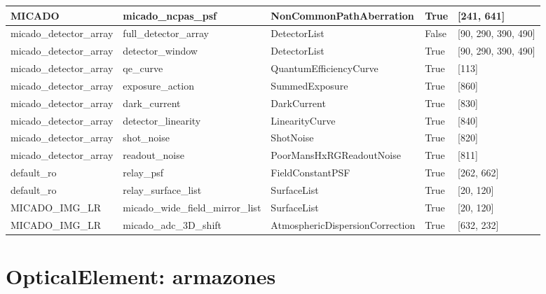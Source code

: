 \documentclass[a4paper]{article}
\newlength{\DUtablewidth} %
\begin{document}
\begin{longtable*}[c]{|p{0.181\DUtablewidth}|p{0.270\DUtablewidth}|p{0.262\DUtablewidth}|p{0.077\DUtablewidth}|p{0.165\DUtablewidth}|}
MICADO
 & 
micado\_ncpas\_psf
 & 
NonCommonPathAberration
 & 
True
 & 
{[}241, 641{]}
 \\
\hline

micado\_detector\_array
 & 
full\_detector\_array
 & 
DetectorList
 & 
False
 & 
{[}90, 290, 390, 490{]}
 \\
\hline

micado\_detector\_array
 & 
detector\_window
 & 
DetectorList
 & 
True
 & 
{[}90, 290, 390, 490{]}
 \\
\hline

micado\_detector\_array
 & 
qe\_curve
 & 
QuantumEfficiencyCurve
 & 
True
 & 
{[}113{]}
 \\
\hline

micado\_detector\_array
 & 
exposure\_action
 & 
SummedExposure
 & 
True
 & 
{[}860{]}
 \\
\hline

micado\_detector\_array
 & 
dark\_current
 & 
DarkCurrent
 & 
True
 & 
{[}830{]}
 \\
\hline

micado\_detector\_array
 & 
detector\_linearity
 & 
LinearityCurve
 & 
True
 & 
{[}840{]}
 \\
\hline

micado\_detector\_array
 & 
shot\_noise
 & 
ShotNoise
 & 
True
 & 
{[}820{]}
 \\
\hline

micado\_detector\_array
 & 
readout\_noise
 & 
PoorMansHxRGReadoutNoise
 & 
True
 & 
{[}811{]}
 \\
\hline

default\_ro
 & 
relay\_psf
 & 
FieldConstantPSF
 & 
True
 & 
{[}262, 662{]}
 \\
\hline

default\_ro
 & 
relay\_surface\_list
 & 
SurfaceList
 & 
True
 & 
{[}20, 120{]}
 \\
\hline

MICADO\_IMG\_LR
 & 
micado\_wide\_field\_mirror\_list
 & 
SurfaceList
 & 
True
 & 
{[}20, 120{]}
 \\
\hline

MICADO\_IMG\_LR
 & 
micado\_adc\_3D\_shift
 & 
AtmosphericDispersionCorrection
 & 
True
 & 
{[}632, 232{]}
 \\
\hline
\end{longtable*}
\label{tbl-effects-summary}


\section{OpticalElement: \textquotedbl{}armazones\textquotedbl{}%
  \label{opticalelement-armazones}%
}
\end{document}
